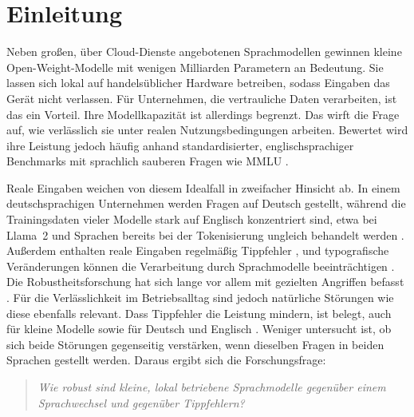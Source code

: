 \documentclass[a4paper,titlepage]{article}
\numberwithin{equation}{section} %
\begin{document}

\setcounter{page}{1}
\setcounter{table}{0} %
\section{Einleitung}\label{sec:einleitung}

Neben großen, über Cloud-Dienste angebotenen Sprachmodellen gewinnen kleine Open-Weight-Modelle mit wenigen Milliarden Parametern an Bedeutung. Sie lassen sich lokal auf handelsüblicher Hardware betreiben, sodass Eingaben das Gerät nicht verlassen. Für Unternehmen, die vertrauliche Daten verarbeiten, ist das ein Vorteil. Ihre Modellkapazität ist allerdings begrenzt. Das wirft die Frage auf, wie verlässlich sie unter realen Nutzungsbedingungen arbeiten. Bewertet wird ihre Leistung jedoch häufig anhand standardisierter, englischsprachiger Benchmarks mit sprachlich sauberen Fragen wie MMLU \citep{hendrycks_measuring_2021}.

Reale Eingaben weichen von diesem Idealfall in zweifacher Hinsicht ab. In einem deutschsprachigen Unternehmen werden Fragen auf Deutsch gestellt, während die Trainingsdaten vieler Modelle stark auf Englisch konzentriert sind, etwa bei Llama~2 \citep{touvron_llama_2023} und Sprachen bereits bei der Tokenisierung ungleich behandelt werden \citep{petrov_language_2023}. Außerdem enthalten reale Eingaben regelmäßig Tippfehler \citep{dhakal_observations_2018}, und typografische Veränderungen können die Verarbeitung durch Sprachmodelle beeinträchtigen \citep{chai_tokenization_2024}. Die Robustheitsforschung hat sich lange vor allem mit gezielten Angriffen befasst \citep{goodfellow_explaining_2014}. Für die Verlässlichkeit im Betriebsalltag sind jedoch natürliche Störungen wie diese ebenfalls relevant. Dass Tippfehler die Leistung mindern, ist belegt, auch für kleine Modelle sowie für Deutsch und Englisch \citep{gan_reasoning_2024, zhao_evaluating_2026}. Weniger untersucht ist, ob sich beide Störungen gegenseitig verstärken, wenn dieselben Fragen in beiden Sprachen gestellt werden. Daraus ergibt sich die Forschungsfrage:

\begin{quote}
\emph{Wie robust sind kleine, lokal betriebene Sprachmodelle gegenüber einem Sprachwechsel und gegenüber Tippfehlern?}
\end{quote}
\end{document}

